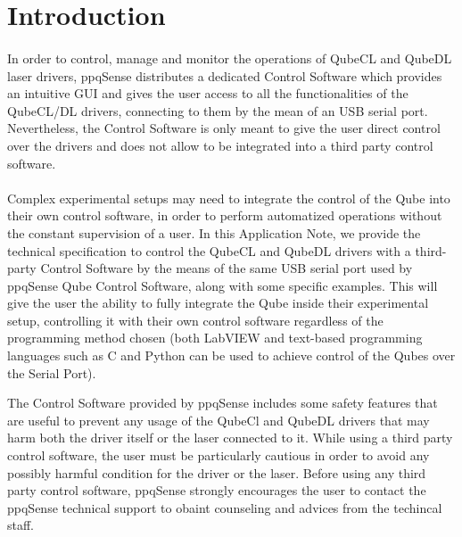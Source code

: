 \section{Introduction}

\paragraph{} In order to control, manage and monitor the operations of QubeCL and QubeDL laser drivers, ppqSense distributes a dedicated Control Software which provides an intuitive GUI and gives the user access to all the functionalities of the QubeCL/DL drivers, connecting to them by the mean of an USB serial port. Nevertheless, the Control Software is only meant to give the user direct control over the drivers and does not allow to be integrated into a third party control software.

\paragraph{} Complex experimental setups may need to integrate the control of the Qube into their own control software, in order to perform automatized operations without the constant supervision of a user. In this Application Note, we provide the technical specification to control the QubeCL and QubeDL drivers with a third-party Control Software by the means of the same USB serial port used by ppqSense Qube Control Software, along with some specific examples. This will give the user the ability to fully integrate the Qube inside their experimental setup, controlling it with their own control software regardless of the programming method chosen (both LabVIEW and text-based programming languages such as C and Python can be used to achieve control of the Qubes over the Serial Port).


\begin{tcolorbox}[enhanced,attach boxed title to top center={yshift=-3mm,yshifttext=-1mm},
                    colback=black!5!white, colframe=red!75!black, colbacktitle=red!80!black,
                    title=CAUTION, fonttitle=\bfseries, boxed title style={size=small, 
                    colframe=black!50!black} ]

    The Control Software provided by ppqSense includes some safety features that are useful to prevent any usage of the QubeCl and QubeDL drivers that may harm both the driver itself or the laser connected to it.
    \newline While using a third party control software, the user must be particularly cautious in order to avoid any possibly harmful condition for the driver or the laser.
    \newline Before using any third party control software, ppqSense strongly encourages the user to contact the ppqSense technical support to obaint counseling and advices from the techincal staff.
\end{tcolorbox}


